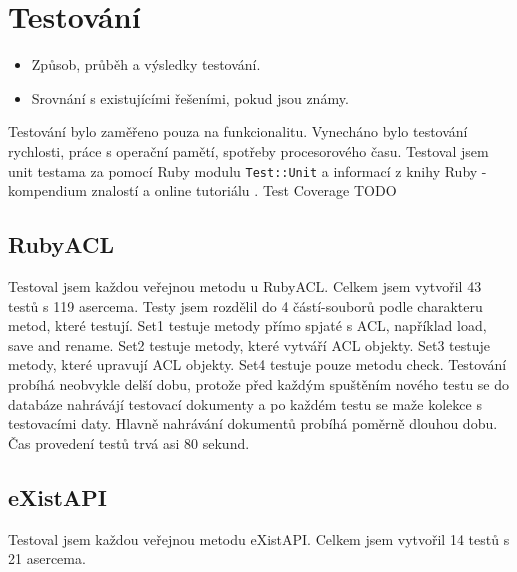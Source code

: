 \chapter{Testování}

\begin{itemize}
 \item Způsob, průběh a výsledky testování.
 \item Srovnání s existujícími řešeními, pokud jsou známy.
\end{itemize} 


Testování bylo zaměřeno pouza na funkcionalitu. Vynecháno bylo testování rychlosti, práce s operační pamětí, spotřeby procesorového času. Testoval jsem unit testama za pomocí Ruby modulu \verb|Test::Unit| a informací z knihy Ruby - kompendium znalostí \cite{Ruby} a online tutoriálu \cite{ibm:unittesting}.
Test Coverage TODO

\section{RubyACL}
Testoval jsem každou veřejnou metodu u RubyACL. Celkem jsem vytvořil 43 testů s 119 asercema. Testy jsem rozdělil do 4 částí-souborů podle charakteru metod, které testují. Set1 testuje metody přímo spjaté s ACL, například load, save and rename. Set2 testuje metody, které vytváří ACL objekty. Set3 testuje metody, které upravují ACL objekty. Set4 testuje pouze metodu check.
Testování probíhá neobvykle delší dobu, protože před každým spuštěním nového testu se do databáze nahrávájí testovací dokumenty a po každém testu se maže kolekce s testovacími daty. Hlavně nahrávání dokumentů probíhá poměrně dlouhou dobu. Čas provedení testů trvá asi 80 sekund.

\section{eXistAPI}
Testoval jsem každou veřejnou metodu eXistAPI. Celkem jsem vytvořil 14 testů s 21 asercema. 